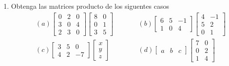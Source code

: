\begin{ejercicio}
\begin{enumerate}
\[\begin{bmatrix}
                0 & -\frac{1}{5} & \frac{3}{10} \\
                -1 & \frac{1}{5} & \frac{7}{10} \\
                0 & \frac{2}{5} & -\frac{1}{10}
            \end{bmatrix}
            \]
        ¿Está definido el producto \(BA\)? Si es así,calcule el producto. ¿En este caso se tiene \(AB = BA\)? 
        \item Obtenga las matrices producto de los siguentes casos 
        $$
        \begin{aligned}
        & (a) \begin{bmatrix}
            0 & 2 & 0 \\
            3 & 0 & 4 \\
            2 & 3 & 0
        \end{bmatrix}
        \begin{bmatrix}
            8 & 0 \\
            0 & 1 \\
            3 & 5
        \end{bmatrix}
        \qquad
        && (b) \begin{bmatrix}
            6 & 5 & -1 \\
            1 & 0 & 4
        \end{bmatrix}
        \begin{bmatrix}
            4 & -1 \\
            5 & 2 \\
            0 & 1
        \end{bmatrix} \\
        & (c) \begin{bmatrix}
            3 & 5 & 0 \\
            4 & 2 & -7
        \end{bmatrix}
        \begin{bmatrix}
            x \\
            y \\
            z
        \end{bmatrix}
        \qquad
        && (d) \begin{bmatrix}
            a & b & c
        \end{bmatrix}
        \begin{bmatrix}
            7 & 0 \\
            0 & 2 \\
            1 & 4
        \end{bmatrix}

\end{aligned}$$
\end{enumerate}
\end{ejercicio}
